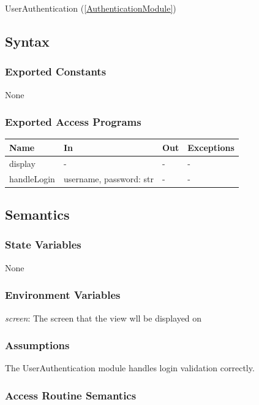 \documentclass[12pt, titlepage]{article}
\begin{document}
UserAuthentication (\ref{AuthenticationModule})

\subsection{Syntax}

\subsubsection{Exported Constants}

None

\subsubsection{Exported Access Programs}

\begin{center}
\begin{tabular}{p{2cm} p{4cm} p{4cm} p{2cm}}
\hline
\textbf{Name} & \textbf{In} & \textbf{Out} & \textbf{Exceptions} \\
\hline
display & - & - & - \\
handleLogin & username, password: str & - & - \\
\hline
\end{tabular}
\end{center}

\subsection{Semantics}

\subsubsection{State Variables}

None

\subsubsection{Environment Variables}

\textit{screen}: The screen that the view wll be displayed on

\subsubsection{Assumptions}

The UserAuthentication module handles login validation correctly.

\subsubsection{Access Routine Semantics}
\end{document}
